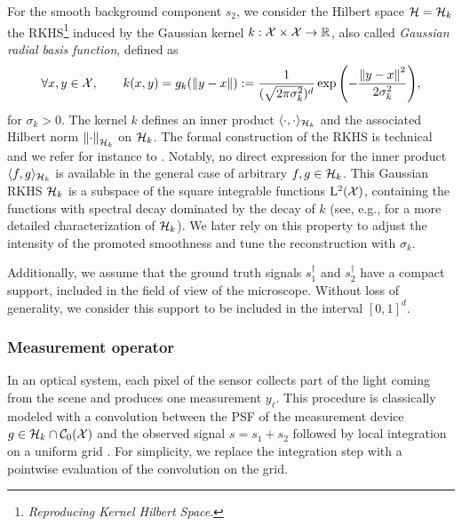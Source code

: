\documentclass[12pt]{article}
\begin{document}

            For the smooth background component $s_2$, we consider the Hilbert space $\mathcal{H} = \mathcal{H}_k$ the RKHS\footnote{\textit{Reproducing Kernel Hilbert Space}.} induced by the Gaussian kernel $k: \mathcal{X} \times \mathcal{X} \to \mathbb{R}$, also called \emph{Gaussian radial basis function}, defined as
            \begin{equation*}
                \forall x, y \in \mathcal{X}, \qquad k(x, y) = g_k(\left\lVert y - x\right\rVert) := \frac{1}{(\sqrt{2\pi\sigma_k^2})^d} \exp{ \left({-\frac{\left\lVert y - x\right\rVert^2}{2 \sigma_k^2}}\right)},
            \end{equation*}
            for $\sigma_k > 0$. The kernel $k$ defines an inner product $\langle \cdot, \cdot \rangle_{\mathcal{H}_k}$ and the associated Hilbert norm $\left\lVert\cdot\right\rVert_{\mathcal{H}_k}$ on $\mathcal{H}_k$. The formal construction of the RKHS is technical and we refer for instance to \cite[Chapter~10]{wendland2004}. Notably, no direct expression for the inner product  $\langle f, g \rangle_{\mathcal{H}_k}$ is available in the general case of arbitrary $f, g \in \mathcal{H}_k$. This Gaussian RKHS $\mathcal{H}_k$ is a subspace of the square integrable functions $\mathrm{L}^2(\mathcal{X})$, containing the functions with spectral decay dominated by the decay of $k$ (see, e.g., \cite{minh2010} for a more detailed characterization of $\mathcal{H}_k$). We later rely on this property to adjust the intensity of the promoted smoothness and tune the reconstruction with $\sigma_k$.

            Additionally, we assume that the ground truth signals $s_1^\dagger$ and $ s_2^\dagger$ have a compact support, included in the field of view of the microscope. Without loss of generality, we consider this support to be included in the interval $[0, 1]^d$. 


        \subsubsection{Measurement operator}        
            In an optical system, each pixel of the sensor collects part of the light coming from the scene and produces one measurement $y_\ell$. This procedure is classically modeled with a convolution between the PSF of the measurement device $g \in \mathcal{H}_k \cap {\mathcal{C}}_0({\mathcal{X}})$ and the observed signal $s = s_1 + s_2$ followed by local integration on a uniform grid \cite{denoyelle2019sliding}. For simplicity, we replace the integration step with a pointwise evaluation of the convolution on the grid.
        
\end{document}
